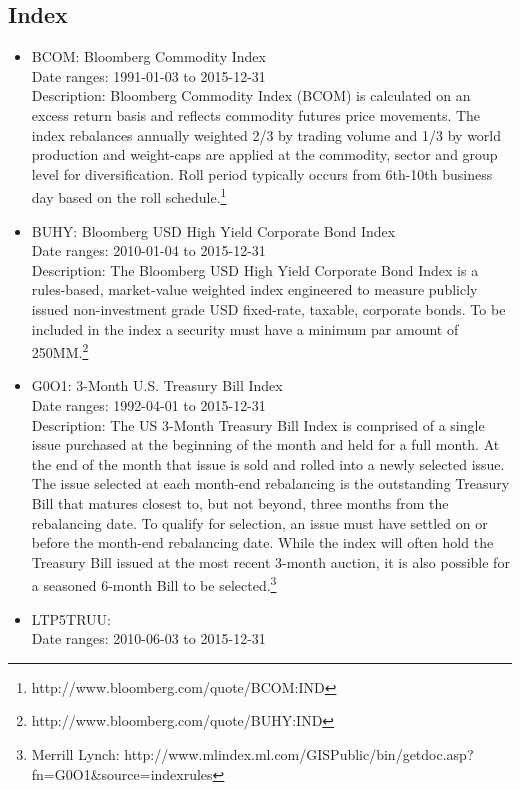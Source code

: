 \documentclass[12pt]{article}
\begin{document}
\subsection{Index}

\begin{itemize}
\item BCOM: Bloomberg Commodity Index\\
Date ranges: 1991-01-03 to 2015-12-31\\
Description: Bloomberg Commodity Index (BCOM) is calculated on an excess return basis and reflects commodity futures price movements. The index rebalances annually weighted 2/3 by trading volume and 1/3 by world production and weight-caps are applied at the commodity, sector and group level for diversification. Roll period typically occurs from 6th-10th business day based on the roll schedule.\footnote{http://www.bloomberg.com/quote/BCOM:IND}
\item BUHY: Bloomberg USD High Yield Corporate Bond Index\\
Date ranges: 2010-01-04 to 2015-12-31 \\
Description: The Bloomberg USD High Yield Corporate Bond Index is a rules-based, market-value weighted index engineered to measure publicly issued non-investment grade USD fixed-rate, taxable, corporate bonds. To be included in the index a security must have a minimum par amount of 250MM.\footnote{http://www.bloomberg.com/quote/BUHY:IND}
\item G0O1: 3-Month U.S. Treasury Bill Index\\
Date ranges: 1992-04-01 to 2015-12-31 \\
Description: The US 3-Month Treasury Bill Index is comprised of a single issue purchased at the beginning of the
month and held for a full month. At the end of the month that issue is sold and rolled into a newly selected issue. The
issue selected at each month-end rebalancing is the outstanding Treasury Bill that matures closest to, but not beyond, three
months from the rebalancing date. To qualify for selection, an issue must have settled on or before the month-end
rebalancing date. While the index will often hold the Treasury Bill issued at the most recent 3-month auction, it is also
possible for a seasoned 6-month Bill to be selected.\footnote{Merrill Lynch: http://www.mlindex.ml.com/GISPublic/bin/getdoc.asp?fn=G0O1\&source=indexrules}
\item LTP5TRUU: \\
Date ranges: 2010-06-03 to 2015-12-31 \\

\end{itemize}
\end{document}
